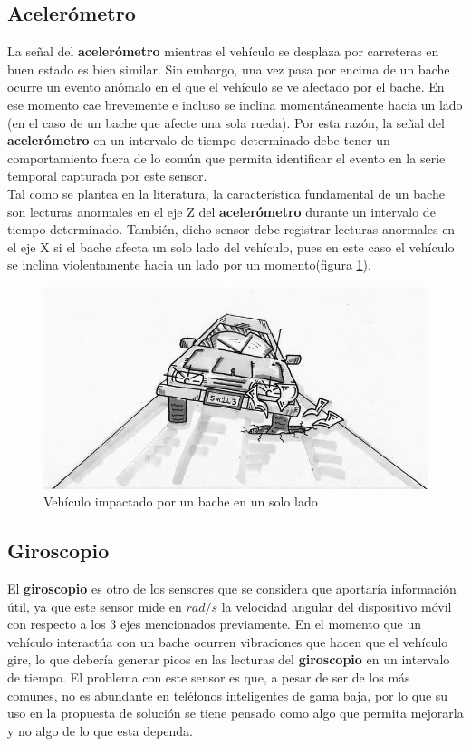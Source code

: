 	\subsection{Acelerómetro}
		La señal del \textbf{acelerómetro} mientras el vehículo se desplaza por carreteras en buen estado es bien similar.
		Sin embargo, una vez pasa por encima de un bache ocurre un evento anómalo en el que el vehículo se ve afectado
		por el bache. En ese momento cae brevemente e incluso se inclina momentáneamente hacia un lado (en el caso de un bache
		que afecte una sola rueda). Por esta razón, la señal del \textbf{acelerómetro} en un intervalo de tiempo determinado debe tener
		un comportamiento fuera de lo común que permita identificar el evento en la serie temporal capturada por este sensor.\\
		\indent Tal como se plantea en la literatura, la característica fundamental de un bache son lecturas anormales en el eje
		Z del \textbf{acelerómetro} durante un intervalo de tiempo determinado. También, dicho sensor debe registrar lecturas
		anormales en el eje X si el bache afecta un solo lado del vehículo, pues en este caso el vehículo se inclina violentamente
		hacia un lado por un momento(figura \ref{fig:4}).\\

	\begin{figure}[htb]
		\centering
		\includegraphics[scale = 0.5]{Graphics/one_side_pothole_vehicle.jpg}
		\caption{Vehículo impactado por un bache en un solo lado}
		\label{fig:4}
	\end{figure}

	\subsection{Giroscopio}
		El \textbf{giroscopio} es otro de los sensores que se considera que aportaría información útil, ya que este sensor 
		mide en $rad/s$ la velocidad angular del dispositivo móvil con respecto a los 3 ejes mencionados previamente. 
		En el momento que un vehículo interactúa con un bache ocurren vibraciones que hacen que el vehículo gire, lo que
		debería generar picos en las lecturas del \textbf{giroscopio} en un intervalo de tiempo. El problema con este sensor es 
		que, a pesar de ser de los más comunes, no es abundante en teléfonos inteligentes de gama baja, por lo que 
		su uso en la propuesta de solución se tiene pensado como algo que permita mejorarla y no algo de lo que esta
		dependa.\\


